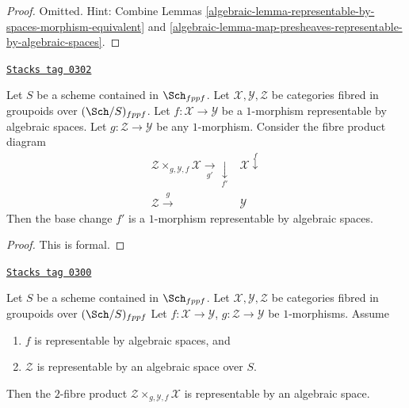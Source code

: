 \begin{proof}

Omitted. Hint: Combine
Lemmas \ref{algebraic-lemma-representable-by-spaces-morphism-equivalent}
and \ref{algebraic-lemma-map-presheaves-representable-by-algebraic-spaces}.
\end{proof}

\begin{lemma}
\label{algebraic-lemma-base-change-representable-by-spaces}
\href{https://stacks.math.columbia.edu/tag/0302}{\texttt{Stacks tag 0302}}

Let $S$ be a scheme contained in $\Sch_{fppf}$.
Let $\mathcal{X}, \mathcal{Y}, \mathcal{Z}$
be categories fibred in groupoids over $(\Sch/S)_{fppf}$.
Let $f : \mathcal{X} \to \mathcal{Y}$ be a $1$-morphism
representable by algebraic spaces.
Let $g : \mathcal{Z} \to \mathcal{Y}$ be any $1$-morphism.
Consider the fibre product diagram
$$
\begin{array}{cc}\mathcal{Z} \times_{g, \mathcal{Y}, f} \mathcal{X} \underset{g'}{\longrightarrow}\underset{f'}{\downarrow} & \mathcal{X} \overset{f}{\downarrow} \\ \mathcal{Z} \overset{g}{\longrightarrow} & \mathcal{Y}\end{array}
$$
Then the base change $f'$ is a $1$-morphism representable by
algebraic spaces.
\end{lemma}

\begin{proof}
This is formal.
\end{proof}

\begin{lemma}
\label{algebraic-lemma-base-change-by-space-representable-by-space}
\href{https://stacks.math.columbia.edu/tag/0300}{\texttt{Stacks tag 0300}}

Let $S$ be a scheme contained in $\Sch_{fppf}$.
Let $\mathcal{X}, \mathcal{Y}, \mathcal{Z}$
be categories fibred in groupoids over $(\Sch/S)_{fppf}$
Let $f : \mathcal{X} \to \mathcal{Y}$,
$g : \mathcal{Z} \to \mathcal{Y}$ be $1$-morphisms.
Assume
\begin{enumerate}
\item $f$ is representable by algebraic spaces, and
\item $\mathcal{Z}$ is representable by an algebraic space over $S$.
\end{enumerate}
Then the $2$-fibre product
$\mathcal{Z} \times_{g, \mathcal{Y}, f} \mathcal{X}$
is representable by an algebraic space.
\end{lemma}

